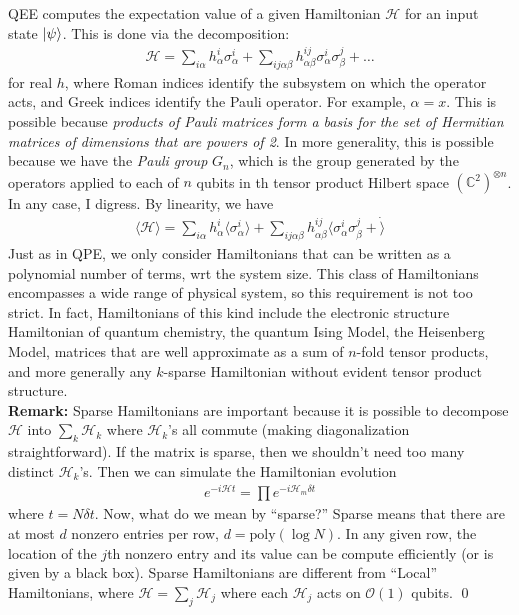 \documentclass{book}
\theoremstyle{definition}
\newcommand{\had}{\mathcal{H}}
\newcommand{\al}{\alpha}
\newcommand{\be}{\beta}
\begin{document}
QEE computes the expectation value of a given Hamiltonian $\had$ for an input state $\ket{\psi}$. This is done via the decomposition:
\begin{align}
\had = \sum_{i\alpha}h^i_\alpha \sigma^i_\alpha + \sum_{ij\al\be}h^{ij}_{\al\be}\sigma^i_\alpha \sigma^j_\be + \dots
\end{align}
for real $h$, where Roman indices identify the subsystem on which the operator acts, and Greek indices identify the Pauli operator. For example, $\alpha = x$. This is possible because \textit{products of Pauli matrices form a basis for the set of Hermitian matrices of dimensions that are powers of 2}. In more generality, this is possible because we have the \textit{Pauli group} $G_n$, which is the group generated by the operators applied to each of $n$ qubits in th tensor product Hilbert space $(\mathbb{C}^2)^{\otimes n}$. \\

In any case, I digress. By linearity, we have
\begin{align}
\langle \had \rangle = \sum_{i\al} h^i_\al \langle \sigma^i_\al \rangle + \sum_{ij\al\be} h^{ij}_{\al\be} \langle \sigma^i_\al \sigma^j_\be  + \dot \rangle 
\end{align}
Just as in QPE, we only consider Hamiltonians that can be written as a  polynomial number of terms, wrt the system size. This class of Hamiltonians encompasses a wide range of physical system, so this requirement is not too strict. In fact, Hamiltonians of this kind include the electronic structure Hamiltonian of quantum chemistry, the quantum Ising Model, the Heisenberg Model, matrices that are well approximate as a sum of $n$-fold tensor products, and more generally any $k$-sparse Hamiltonian without evident tensor product structure.\\

\textbf{Remark:} Sparse Hamiltonians are important because it is possible to decompose $\had$ into $\sum_k \had_k$ where $\had_k$'s all commute (making diagonalization straightforward). If the matrix is sparse, then we shouldn't need too many distinct $\had_k$'s. Then we can simulate the Hamiltonian evolution 
\begin{align}
e^{-i\had t} = \prod e^{-i \had_m \delta t}
\end{align}
where $t =N \delta t$. Now, what do we mean by ``sparse?'' Sparse means that there are at most $d$ nonzero entries per row, $d = \text{poly}(\log N)$. In any given row, the location of the $j$th nonzero entry and its value can be compute efficiently (or is given by a black box). Sparse Hamiltonians are different from ``Local'' Hamiltonians, where $\had = \sum_j \had_j$ where each $\had_j$ acts on $\mathcal{O}(1)$ qubits. \qed\\
\end{document}

